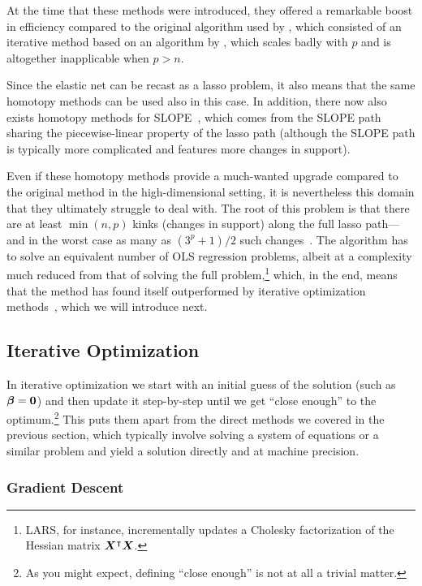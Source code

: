 At the time that these methods were introduced, they offered a remarkable boost in efficiency compared to the original algorithm used by \textcite{tibshirani1996}, which consisted of an iterative method based on an algorithm by \textcite{lawson1995}, which scales badly with \(p\) and is altogether inapplicable when \(p > n\).

Since the elastic net can be recast as a lasso problem, it also means that the same homotopy methods can be used also in this case. In addition, there now also exists homotopy methods for SLOPE~\parencite{nomura2020,dupuis2023}, which comes from the SLOPE path sharing the piecewise-linear property of the lasso path (although the SLOPE path is typically more complicated and features more changes in support).

Even if these homotopy methods provide a much-wanted upgrade compared to the original method in the high-dimensional setting, it is nevertheless this domain that they ultimately struggle to deal with. The root of this problem is that there are at least \(\min(n,p)\) kinks (changes in support) along the full lasso path---and in the worst case as many as \((3^p + 1)/2\) such changes~\parencite{mairal2012}. The algorithm has to solve an equivalent number of OLS regression problems, albeit at a complexity much reduced from that of solving the full problem,\footnote{LARS, for instance, incrementally updates a Cholesky factorization of the Hessian matrix \(\boldsymbol{X}^\intercal\boldsymbol{X}\).} which, in the end, means that the method has found itself outperformed by iterative optimization methods~\parencite{friedman2010}, which we will introduce next.

\subsection{Iterative Optimization}\label{sec:iterative-optimization}

In iterative optimization we start with an initial guess of the solution (such as \(\boldsymbol{\beta} = \boldsymbol{0}\)) and then update it step-by-step until we get ``close enough'' to the optimum.\footnote{As you might expect, defining ``close enough'' is not at all a trivial matter.} This puts them apart from the direct methods we covered in the previous section, which typically involve solving a system of equations or a similar problem and yield a solution directly and at machine precision.

\subsubsection{Gradient Descent}

